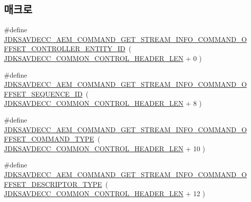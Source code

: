 \subsection*{매크로}
\begin{DoxyCompactItemize}
\item 
\#define \hyperlink{group__command__get__stream__info_ga14aadccda606f36f8b1808d5cebeae08}{J\+D\+K\+S\+A\+V\+D\+E\+C\+C\+\_\+\+A\+E\+M\+\_\+\+C\+O\+M\+M\+A\+N\+D\+\_\+\+G\+E\+T\+\_\+\+S\+T\+R\+E\+A\+M\+\_\+\+I\+N\+F\+O\+\_\+\+C\+O\+M\+M\+A\+N\+D\+\_\+\+O\+F\+F\+S\+E\+T\+\_\+\+C\+O\+N\+T\+R\+O\+L\+L\+E\+R\+\_\+\+E\+N\+T\+I\+T\+Y\+\_\+\+ID}~( \hyperlink{group__jdksavdecc__avtp__common__control__header_gaae84052886fb1bb42f3bc5f85b741dff}{J\+D\+K\+S\+A\+V\+D\+E\+C\+C\+\_\+\+C\+O\+M\+M\+O\+N\+\_\+\+C\+O\+N\+T\+R\+O\+L\+\_\+\+H\+E\+A\+D\+E\+R\+\_\+\+L\+EN} + 0 )
\item 
\#define \hyperlink{group__command__get__stream__info_gacca20f9ed2e3488d1e1bc83416844fef}{J\+D\+K\+S\+A\+V\+D\+E\+C\+C\+\_\+\+A\+E\+M\+\_\+\+C\+O\+M\+M\+A\+N\+D\+\_\+\+G\+E\+T\+\_\+\+S\+T\+R\+E\+A\+M\+\_\+\+I\+N\+F\+O\+\_\+\+C\+O\+M\+M\+A\+N\+D\+\_\+\+O\+F\+F\+S\+E\+T\+\_\+\+S\+E\+Q\+U\+E\+N\+C\+E\+\_\+\+ID}~( \hyperlink{group__jdksavdecc__avtp__common__control__header_gaae84052886fb1bb42f3bc5f85b741dff}{J\+D\+K\+S\+A\+V\+D\+E\+C\+C\+\_\+\+C\+O\+M\+M\+O\+N\+\_\+\+C\+O\+N\+T\+R\+O\+L\+\_\+\+H\+E\+A\+D\+E\+R\+\_\+\+L\+EN} + 8 )
\item 
\#define \hyperlink{group__command__get__stream__info_gad9aaa54c7ad6d9194bec7c5b7c4b5295}{J\+D\+K\+S\+A\+V\+D\+E\+C\+C\+\_\+\+A\+E\+M\+\_\+\+C\+O\+M\+M\+A\+N\+D\+\_\+\+G\+E\+T\+\_\+\+S\+T\+R\+E\+A\+M\+\_\+\+I\+N\+F\+O\+\_\+\+C\+O\+M\+M\+A\+N\+D\+\_\+\+O\+F\+F\+S\+E\+T\+\_\+\+C\+O\+M\+M\+A\+N\+D\+\_\+\+T\+Y\+PE}~( \hyperlink{group__jdksavdecc__avtp__common__control__header_gaae84052886fb1bb42f3bc5f85b741dff}{J\+D\+K\+S\+A\+V\+D\+E\+C\+C\+\_\+\+C\+O\+M\+M\+O\+N\+\_\+\+C\+O\+N\+T\+R\+O\+L\+\_\+\+H\+E\+A\+D\+E\+R\+\_\+\+L\+EN} + 10 )
\item 
\#define \hyperlink{group__command__get__stream__info_ga1bdfb005dd86aa625755510019b76a90}{J\+D\+K\+S\+A\+V\+D\+E\+C\+C\+\_\+\+A\+E\+M\+\_\+\+C\+O\+M\+M\+A\+N\+D\+\_\+\+G\+E\+T\+\_\+\+S\+T\+R\+E\+A\+M\+\_\+\+I\+N\+F\+O\+\_\+\+C\+O\+M\+M\+A\+N\+D\+\_\+\+O\+F\+F\+S\+E\+T\+\_\+\+D\+E\+S\+C\+R\+I\+P\+T\+O\+R\+\_\+\+T\+Y\+PE}~( \hyperlink{group__jdksavdecc__avtp__common__control__header_gaae84052886fb1bb42f3bc5f85b741dff}{J\+D\+K\+S\+A\+V\+D\+E\+C\+C\+\_\+\+C\+O\+M\+M\+O\+N\+\_\+\+C\+O\+N\+T\+R\+O\+L\+\_\+\+H\+E\+A\+D\+E\+R\+\_\+\+L\+EN} + 12 )

\end{DoxyCompactItemize}
